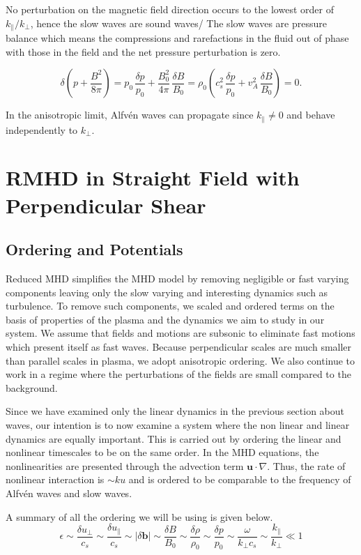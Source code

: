 No perturbation on the magnetic field direction occurs to the lowest order of \(k_{\parallel}/k_{\perp}\), hence the slow waves are sound waves/ The slow waves are pressure balance which means the compressions and rarefactions in the fluid out of phase with those in the field and the net pressure perturbation is zero.

\begin{equation*}
    \delta \!\left( p + \frac{B^2}{8\pi} \right) = p_0 \,\frac{\delta p}{p_0} + \frac{B_0^2}{4\pi}\,\frac{\delta B}{B_0} = \rho_0 \left( c_s^2 \,\frac{\delta p}{p_0} + v_A^2 \,\frac{\delta B}{B_0} \right)= 0.
\end{equation*}

In the anisotropic limit, Alfv\'en waves can propagate since \(k_{\parallel} \neq0\) and behave independently to \(k_{\perp}\). 


\section{RMHD in Straight Field with Perpendicular Shear}
\subsection{Ordering and Potentials}
Reduced MHD simplifies the MHD model by removing negligible or fast varying components leaving only the slow varying and interesting dynamics such as turbulence. To remove such components, we scaled and ordered terms on the basis of properties of the plasma and the dynamics we aim to study in our system. We assume that fields and motions are subsonic to eliminate fast motions which present itself as fast waves. Because perpendicular scales are much smaller than parallel scales in plasma, we adopt anisotropic ordering. We also continue to work in a regime where the perturbations of the fields are small compared to the background. 

Since we have examined only the linear dynamics in the previous section about waves, our intention is to now examine a system where the non linear and linear dynamics are equally important. This is carried out by ordering the linear and nonlinear timescales to be on the same order. In the MHD equations, the nonlinearities are presented through the advection term \(\boldsymbol{u}\cdot \nabla\). Thus, the rate of nonlinear interaction is \(\sim ku\) and is ordered to be comparable to the frequency of Alfv\'en waves and slow waves. 

A summary of all the ordering we will be using is given below.
\begin{equation*}
    \epsilon \sim \frac{\delta u_{\perp}}{c_s} \sim \frac{\delta u_{\parallel}}{c_s} \sim \lvert \delta \boldsymbol{b} \rvert \sim \frac{\delta B}{B_0} \sim \frac{\delta \rho}{\rho_0} \sim \frac{\delta p}{p_0} \sim \frac{\omega}{k_{\perp} c_s} \sim \frac{k_{\parallel}}{k_{\perp}} \ll 1
\end{equation*}

